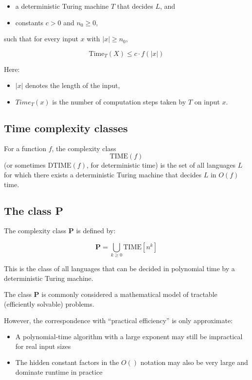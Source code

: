 \documentclass[11pt]{article}
\providecommand{\tightlist}{%
      \setlength{\itemsep}{0pt}\setlength{\parskip}{0pt}}
\begin{document}
\begin{itemize}
\tightlist
\item
  a deterministic Turing machine \(T\) that decides \(L\), and
\item
  constants \(c>0\) and \(n_0 \geq 0\),
\end{itemize}

such that for every input \(x\) with \(|x| \geq n_0\),

\[
\text{Time}_T(X) \leq c \cdot f(|x|)
\]

Here:

\begin{itemize}
\tightlist
\item
  \(|x|\) denotes the length of the input,
\item
  \(Time_T(x)\) is the number of computation steps taken by \(T\) on
  input \(x\).
\end{itemize}

\subsection{Time complexity classes}\label{time-complexity-classes}

For a function \(f\), the complexity class \[
\text{TIME}(f)
\] (or sometimes \(\text{DTIME}(f)\), for deterministic time) is the set
of all languages \(L\) for which there exists a deterministic Turing
machine that decides \(L\) in \(O(f)\) time.

\subsection{\texorpdfstring{The class
\textbf{P}}{The class P}}\label{the-class-p}

The complexity class \textbf{P} is defined by:

\[
\textbf{P} = \bigcup_{k \geq 0} \text{TIME}[n^k]
\]

This is the class of all languages that can be decided in polynomial
time by a deterministic Turing machine.

The class \textbf{P} is commonly considered a mathematical model of
tractable (efficiently solvable) problems.

However, the correspondence with ``practical efficiency'' is only
approximate:

\begin{itemize}
\tightlist
\item
  A polynomial-time algorithm with a large exponent may still be
  impractical for real input sizes
\item
  The hidden constant factors in the \(O()\) notation may also be very
  large and dominate runtime in practice
\end{itemize}
\end{document}

